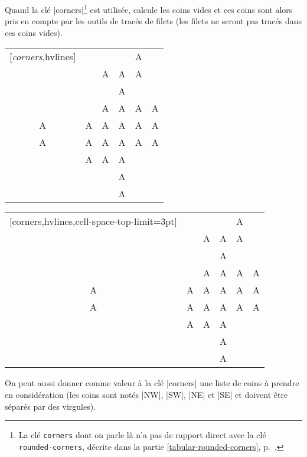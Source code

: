 \documentclass[dvipsnames]{article}%
\begin{document}
\medskip
Quand la clé |corners|\footnote{La clé \texttt{corners} dont on parle là
  n'a pas de rapport direct avec la clé \texttt{rounded-corners},
  décrite dans la partie \ref{tabular-rounded-corners},
  p.~\pageref{tabular-rounded-corners}.} est utilisée,  calcule
les coins vides et ces coins sont alors pris en compte par les outils de tracés
de filets (les filets ne seront pas tracés dans ces coins vides). 

\medskip
\begin{Code}[width=11cm]
\begin{NiceTabular}{*{6}{c}}[\emph{corners},hvlines]
  &   &   &   & A \\
  &   & A & A & A \\
  &   &   & A \\
  &   & A & A & A & A \\
A & A & A & A & A & A \\
A & A & A & A & A & A \\
  & A & A & A \\
  &  & & A \\
  &   &   & A \\
\end{NiceTabular}
\end{Code}
\begin{NiceTabular}{*{6}{c}}[corners,hvlines,cell-space-top-limit=3pt]
  &   &   &   & A \\
  &   & A & A & A \\
  &   &   & A \\
  &   & A & A & A & A \\
A & A & A & A & A & A \\
A & A & A & A & A & A \\
  & A & A & A \\
  &  & & A \\
  &   &   & A \\
\end{NiceTabular}

\vspace{1cm}
On peut aussi donner comme valeur à la clé |corners| une liste de coins à
prendre en considération (les coins sont notés |NW|, |SW|, |NE| et |SE| et
doivent être séparés par des virgules).
\end{document}

